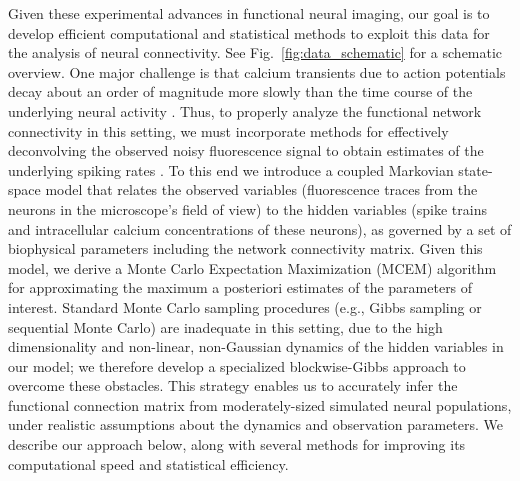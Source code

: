 Given these experimental advances in functional neural imaging, our goal is to develop efficient computational and statistical methods to exploit this data for the analysis of neural connectivity. See Fig.~\ref{fig:data_schematic} for a schematic overview. One major challenge is that calcium transients due to action potentials decay about an order of magnitude more slowly than the time course of the underlying neural activity \cite{ImagingManual}. Thus, to properly analyze the functional network connectivity in this setting, we must incorporate methods for effectively deconvolving the observed noisy fluorescence signal to obtain estimates of the underlying spiking rates \cite{YaksiFriedrich06,GreenbergKerr08,Vogelstein2009}. To this end we introduce a coupled Markovian state-space model that relates the observed variables (fluorescence traces from the neurons in the microscope's field of view) to the hidden variables (spike trains and intracellular calcium concentrations of these neurons), as governed by a set of biophysical parameters including the network connectivity matrix. Given this model, we derive a Monte Carlo Expectation Maximization (MCEM) algorithm for approximating the maximum a posteriori estimates of the parameters of interest. Standard Monte Carlo sampling procedures (e.g., Gibbs sampling or sequential Monte Carlo) are inadequate in this setting, due to the high dimensionality and non-linear, non-Gaussian dynamics of the hidden variables in our model; we therefore develop a specialized blockwise-Gibbs approach to overcome these obstacles. This strategy enables us to accurately infer the functional connection matrix from moderately-sized simulated neural populations, under realistic assumptions about the dynamics and observation parameters. We describe our approach below, along with several methods for improving its computational speed and statistical efficiency.